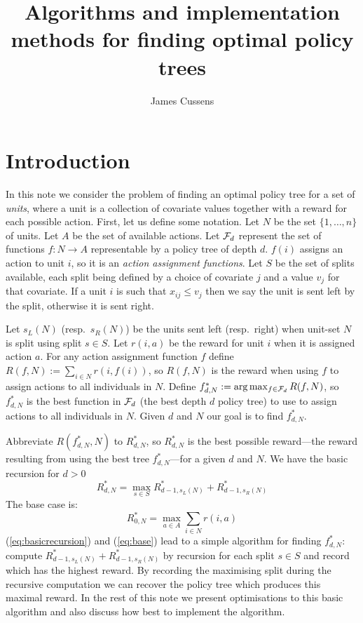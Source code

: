 \documentclass{article}
\title{Algorithms and implementation methods for finding optimal policy trees}
\author{James Cussens}
\begin{document}
\maketitle

\section{Introduction}
\label{sec:intro}

In this note we consider the problem of finding an optimal policy tree
for a set of \emph{units}, where a unit is a collection of covariate
values together with a reward for each possible action. First, let us
define some notation.  Let $N$ be the set $\{1,\dots,n\}$ of
units. Let $A$ be the set of available actions.  Let ${\cal F}_d$
represent the set of functions $f:N \rightarrow A$ representable by a
policy tree of depth $d$. $f(i)$ assigns an action to unit $i$, so it
is an \emph{action assignment functions}. Let $S$ be the set of splits
available, each split being defined by a choice of covariate $j$ and
a value $v_j$ for that covariate. If a unit $i$ is such that
$x_{ij} \leq v_{j}$ then we say the unit is sent left by the split,
otherwise it is sent right.

Let $s_{L}(N)$ (resp.\ $s_{R}(N)$) be the units sent left (resp.\
right) when unit-set $N$ is split using split $s \in S$. Let $r(i,a)$
be the reward for unit $i$ when it is assigned action $a$. For any
action assignment function $f$ define
$R(f,N) := \sum_{i \in N} r(i,f(i))$, so $R(f,N)$ is the reward when
using $f$ to assign actions to all individuals in $N$. Define
$f^{*}_{d,N} := \arg\max_{f \in {\cal F}_d} R(f,N)$, so $f^{*}_{d,N}$
is the best function in ${\cal F}_d$ (the best depth $d$ policy tree)
to use to assign actions to all individuals in $N$. Given $d$ and $N$
our goal is to find $f^{*}_{d,N}$.

Abbreviate $R(f^{*}_{d,N},N)$ to $R^{*}_{d,N}$, so $R^{*}_{d,N}$ is the best
possible reward---the reward resulting from using the best tree
$f^{*}_{d,N}$---for a given $d$ and $N$. We have the basic recursion
for $d>0$
\begin{equation}
  \label{eq:basicrecursion}
  R^{*}_{d,N}
  = \max_{s \in S}   R^{*}_{d-1,s_{L}(N)} + R^{*}_{d-1,s_{R}(N)} 
\end{equation}
The base case is:
\begin{equation}
  \label{eq:base}
    R^{*}_{0,N} =  \max_{a \in A} \sum_{i \in N}  r(i,a)
\end{equation}
(\ref{eq:basicrecursion}) and (\ref{eq:base}) lead to a simple
algorithm for finding $f^{*}_{d,N}$: compute $R^{*}_{d-1,s_{L}(N)} +
R^{*}_{d-1,s_{R}(N)}$ by recursion for each split $s \in S$ and record
which has the highest reward. By recording the maximising
split during the recursive computation we can recover the policy tree
which produces this maximal reward. In the rest of this note we
present optimisations to this basic algorithm and also discuss how
best to implement the algorithm.
\end{document}
